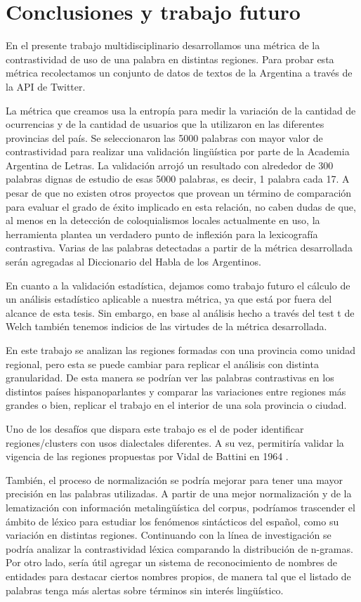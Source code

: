 \section{Conclusiones y trabajo futuro}
En el presente trabajo multidisciplinario desarrollamos una métrica de la contrastividad de uso de una palabra en distintas regiones. Para probar esta métrica recolectamos un conjunto de datos de textos de la Argentina a través de la API de Twitter.

La métrica que creamos usa la entropía para medir la variación de la cantidad de ocurrencias y de la cantidad de usuarios que la utilizaron en las diferentes provincias del país. Se seleccionaron las 5000 palabras con mayor valor de contrastividad para realizar una validación lingüística por parte de la Academia Argentina de Letras. La validación arrojó un resultado con alrededor de 300 palabras dignas de estudio de esas 5000 palabras, es decir, 1 palabra cada 17. 
A pesar de que no existen otros proyectos que provean un término de comparación para evaluar el grado de éxito implicado en esta relación, no caben dudas de que, al menos en la detección de coloquialismos locales actualmente en uso, la herramienta plantea un verdadero punto de inflexión para la lexicografía contrastiva.
Varias de las palabras detectadas a partir de la métrica desarrollada serán agregadas al Diccionario del Habla de los Argentinos.

En cuanto a la validación estadística, dejamos como trabajo futuro el cálculo de un análisis estadístico aplicable a nuestra métrica, ya que está por fuera del alcance de esta tesis. Sin embargo, en base al análisis hecho a través del test t de Welch también tenemos indicios de las virtudes de la métrica desarrollada. 

En este trabajo se analizan las regiones formadas con una provincia como unidad regional, pero esta se puede cambiar para replicar el análisis con distinta granularidad. De esta manera se podrían ver las palabras contrastivas en los distintos países hispanoparlantes y comparar las variaciones entre regiones más grandes o bien, replicar el trabajo en el interior de una sola provincia o ciudad.

Uno de los desafíos que dispara este trabajo es el de poder identificar regiones/clusters con usos dialectales diferentes. A su vez, permitiría validar la vigencia de las regiones propuestas por Vidal de Battini en 1964 \cite{vidal1964espanol}.

También, el proceso de normalización se podría mejorar para tener una mayor precisión en las palabras utilizadas. A partir de una mejor normalización y de la lematización con información metalingüística del corpus, podríamos trascender el ámbito de léxico para estudiar los fenómenos sintácticos del español, como su variación en distintas regiones. Continuando con la línea de investigación se podría analizar la contrastividad léxica comparando la distribución de n-gramas. Por otro lado, sería útil agregar un sistema de reconocimiento de nombres de entidades para destacar ciertos nombres propios, de manera tal que el listado de palabras tenga más alertas sobre términos sin interés lingüístico.

